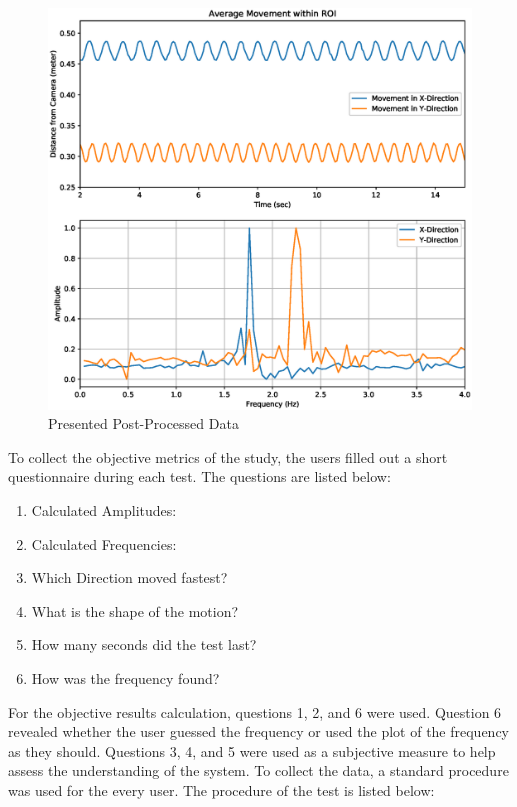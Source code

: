 \documentclass{sigchi}
\begin{document}
\begin{figure}[ht]
    \centering
    \includegraphics[width=\columnwidth]{Figures/6.eps}
    \caption{Presented Post-Processed Data}
    \label{fig:post}
\end{figure}

To collect the objective metrics of the study, the users filled out a short questionnaire during each test. The questions are listed below:

\begin{enumerate}
    \item Calculated Amplitudes:
    \item Calculated Frequencies:
    \item Which Direction moved fastest?
    \item What is the shape of the motion?
    \item How many seconds did the test last?
    \item How was the frequency found?
\end{enumerate}

For the objective results calculation, questions 1, 2, and 6 were used. Question 6 revealed whether the user guessed the frequency or used the plot of the frequency as they should. Questions 3, 4, and 5 were used as a subjective measure to help assess the understanding of the system. To collect the data, a standard procedure was used for the every user. The procedure of the test is listed below:
\end{document}
